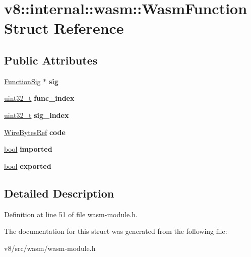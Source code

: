 \hypertarget{structv8_1_1internal_1_1wasm_1_1WasmFunction}{}\section{v8\+:\+:internal\+:\+:wasm\+:\+:Wasm\+Function Struct Reference}
\label{structv8_1_1internal_1_1wasm_1_1WasmFunction}
\subsection*{Public Attributes}
\begin{DoxyCompactItemize}
\item 
\mbox{\label{structv8_1_1internal_1_1wasm_1_1WasmFunction_ad391006f992ed49217dcc0437650006f}} 
\mbox{\hyperlink{classv8_1_1internal_1_1Signature}{Function\+Sig}} $\ast$ {\bfseries sig}
\item 
\mbox{\label{structv8_1_1internal_1_1wasm_1_1WasmFunction_a8b451aaa09042c8dcc935d85f4fa0422}} 
\mbox{\hyperlink{classuint32__t}{uint32\+\_\+t}} {\bfseries func\+\_\+index}
\item 
\mbox{\label{structv8_1_1internal_1_1wasm_1_1WasmFunction_a9ac4b76d03024a8579bec15a76059c99}} 
\mbox{\hyperlink{classuint32__t}{uint32\+\_\+t}} {\bfseries sig\+\_\+index}
\item 
\mbox{\label{structv8_1_1internal_1_1wasm_1_1WasmFunction_aec97739a140bf8da830c55636434adcf}} 
\mbox{\hyperlink{classv8_1_1internal_1_1wasm_1_1WireBytesRef}{Wire\+Bytes\+Ref}} {\bfseries code}
\item 
\mbox{\label{structv8_1_1internal_1_1wasm_1_1WasmFunction_af8099247d56554096502101a9b7321be}} 
\mbox{\hyperlink{classbool}{bool}} {\bfseries imported}
\item 
\mbox{\label{structv8_1_1internal_1_1wasm_1_1WasmFunction_a14e027b8538f33fdc86797af1c069334}} 
\mbox{\hyperlink{classbool}{bool}} {\bfseries exported}
\end{DoxyCompactItemize}


\subsection{Detailed Description}


Definition at line 51 of file wasm-\/module.\+h.



The documentation for this struct was generated from the following file\+:\begin{DoxyCompactItemize}
\item 
v8/src/wasm/wasm-\/module.\+h\end{DoxyCompactItemize}
